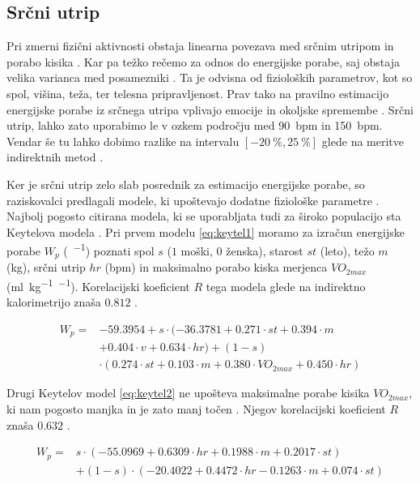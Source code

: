 \subsection{Srčni utrip}
Pri zmerni fizični aktivnosti obstaja linearna povezava med srčnim utripom in porabo kisika \cite{keytel2005prediction}. Kar pa težko rečemo za odnos do energijske porabe, saj obstaja velika varianca med posamezniki \cite{levine2005measurement}. Ta je odvisna od fizioloških parametrov, kot so spol, višina, teža, ter telesna pripravljenost. Prav tako na pravilno estimacijo energijske porabe iz srčnega utripa vplivajo emocije in okoljske spremembe \cite{keytel2005prediction}. Srčni utrip, lahko zato uporabimo le v ozkem področju med \SI{90}{bpm} in \SI{150}{bpm}. Vendar še tu lahko dobimo razlike na intervalu $[-20~\% , 25~\%]$ glede na meritve indirektnih metod \cite{keytel2005prediction}. 

Ker je srčni utrip zelo slab posrednik za estimacijo energijske porabe, so raziskovalci predlagali modele, ki upoštevajo dodatne fiziološke parametre \cite{charlot2014improvement}. Najbolj pogosto citirana modela, ki se uporabljata tudi za široko populacijo sta Keytelova modela \cite{keytel2005prediction}. Pri prvem modelu \eqref{eq:keytel1} moramo za izračun energijske porabe $W_p$ (\si{\kcal.\min^{-1}}) poznati spol $s$ ($1$ moški, $0$ ženska), starost $st$ (leto), težo $m$ (\si{\kg}), srčni utrip $hr$ (\si{bpm}) in maksimalno porabo kiska merjenca $VO_{2max}$ (\si{\ml.\kg^{-1}.\min^{-1}}). Korelacijski koeficient $R$ tega modela glede na indirektno kalorimetrijo znaša $0.812$ \cite{charlot2014improvement}.

\begin{align} \label{eq:keytel1}
W_p = & -59.3954 + s \cdot (-36.3781 + 0.271 \cdot st + 0.394 \cdot m  \nonumber \\
& + 0.404 \cdot v + 0.634 \cdot hr ) + (1 - s) \nonumber \\
& \cdot (0.274 \cdot st + 0.103 \cdot m + 0.380 \cdot VO_{2max} + 0.450 \cdot hr)
\end{align}

Drugi Keytelov model \eqref{eq:keytel2} ne upošteva maksimalne porabe kisika $VO_{2max}$, ki nam pogosto manjka in je zato manj točen \cite{keytel2005prediction}. Njegov korelacijski koeficient $R$ znaša $0.632$ \cite{charlot2014improvement}.

\begin{align}\label{eq:keytel2}
 W_p = & s \cdot (-55.0969 + 0.6309 \cdot hr + 0.1988 \cdot m + 0.2017 \cdot st) \nonumber \\
 & + (1 - s) \cdot (-20.4022 + 0.4472 \cdot hr - 0.1263 \cdot m + 0.074 \cdot st)
\end{align}

